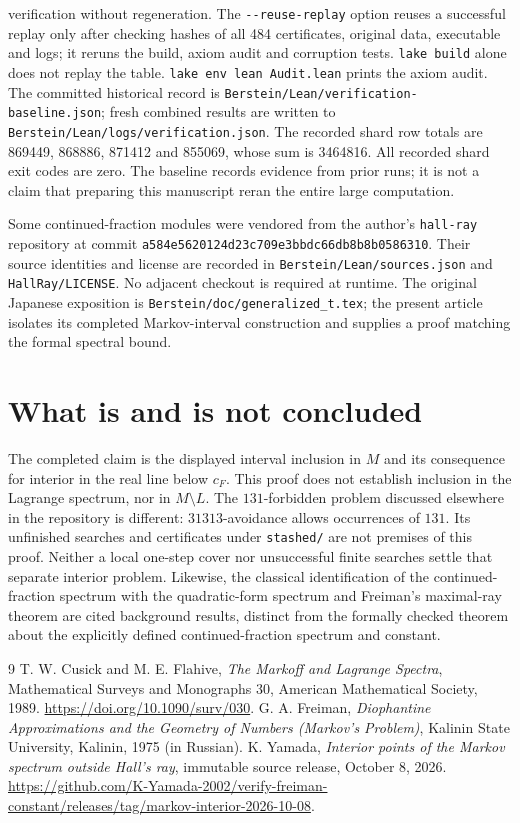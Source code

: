 \documentclass[11pt,a4paper]{article}
\newcommand{\file}[1]{{\normalfont\small\nolinkurl{#1}}}
\begin{document}
verification without regeneration. The \file{--reuse-replay} option
reuses a successful replay only after checking hashes of all 484
certificates, original data, executable and logs; it reruns the build,
axiom audit and corruption tests. \file{lake build} alone does not replay
the table. \file{lake env lean Audit.lean} prints the axiom audit.
The committed historical record is
\file{Berstein/Lean/verification-baseline.json}; fresh combined results
are written to \file{Berstein/Lean/logs/verification.json}.
The recorded shard row totals are 869449, 868886, 871412 and 855069,
whose sum is 3464816. All recorded shard exit codes are zero.
The baseline records evidence from prior runs; it is not a claim that
preparing this manuscript reran the entire large computation.

Some continued-fraction modules were vendored from the author's
\file{hall-ray} repository at commit
\file{a584e5620124d23c709e3bbdc66db8b8b0586310}.
Their source identities and license are recorded in
\file{Berstein/Lean/sources.json} and \file{HallRay/LICENSE}.
No adjacent checkout is required at runtime.
The original Japanese exposition is
\file{Berstein/doc/generalized_t.tex}; the present article isolates its
completed Markov-interval construction and supplies a proof matching
the formal spectral bound.

\section{What is and is not concluded}
The completed claim is the displayed interval inclusion in $M$ and
its consequence for interior in the real line below $c_F$.
This proof does not establish inclusion in the Lagrange spectrum,
nor in $M\setminus L$. The $131$-forbidden problem discussed elsewhere
in the repository is different: $31313$-avoidance allows occurrences
of $131$. Its unfinished searches and certificates under
\file{stashed/} are not premises of this proof. Neither a local
one-step cover nor unsuccessful finite searches settle that separate
interior problem. Likewise, the classical identification of the
continued-fraction spectrum with the quadratic-form spectrum and
Freiman's maximal-ray theorem are cited background results, distinct
from the formally checked theorem about the explicitly defined
continued-fraction spectrum and constant.

\begin{thebibliography}{9}
 T. W. Cusick and M. E. Flahive,
\emph{The Markoff and Lagrange Spectra}, Mathematical Surveys and
Monographs 30, American Mathematical Society, 1989.
\url{https://doi.org/10.1090/surv/030}.
 G. A. Freiman,
\emph{Diophantine Approximations and the Geometry of Numbers
(Markov's Problem)}, Kalinin State University, Kalinin, 1975
(in Russian).
 K. Yamada,
\emph{Interior points of the Markov spectrum outside Hall's ray},
immutable source release, October 8, 2026.
\url{https://github.com/K-Yamada-2002/verify-freiman-constant/releases/tag/markov-interior-2026-10-08}.
\end{thebibliography}
\end{document}

